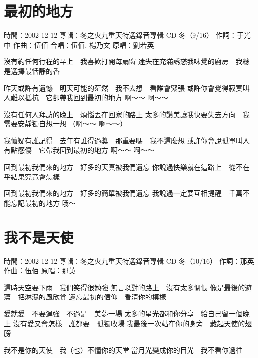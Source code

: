 \documentclass[UTF8,a4paper,oneside,twocolumn,12pt]{ctexbook}
\newcommand{\infopair}[2]{\textbullet #1：#2}
\newcommand{\zc}[1][伍佰]{\infopair{作詞}{#1}}
\newcommand{\zq}[1][伍佰]{\infopair{作曲}{#1}}
\newcommand{\zj}[1]{\infopair{專輯}{#1}}
\newcommand{\yc}[1]{\infopair{原唱}{#1}}
\newcommand{\sj}[1]{\infopair{時間}{#1}}
\newenvironment{info}{\begin{flushleft}\kaishu
	}
	{\end{flushleft}\normalsize\yahei\par}
\newenvironment{lyric}{
	}
{}
\begin{document}
\section{最初的地方}
\begin{info}
	\sj{2002-12-12}
	\zj{冬之火九重天特選錄音專輯 CD 冬（9/16）}
	\zc[于光中]
	\zq
	\infopair{合唱}{伍佰, 楊乃文}
	\yc{劉若英}
\end{info}
\begin{lyric}
	沒有約任何行程的早上　我喜歡打開每扇窗
	迷失在充滿誘惑我味覺的廚房　我總是選擇最恬靜的香

	昨天或許有遺憾　明天可能的茫然　我不去想　看誰會緊張
	或許你會覺得寂寞叫人難以抵抗　它卻帶我回到最初的地方
	啊～～ 啊～～

	沒有任何人拜訪的晚上　煩惱丟在回家的路上
	太多的讚美讓我快要失去方向　我需要安靜獨自想一想
	（啊～～ 啊～～）

	我懷疑有誰記得　去年有誰得過獎　那重要嗎　我不這麼想
	或許你會說孤單叫人有點感傷　它帶我回到最初的地方
	啊～～ 啊～～

	回到最初我們來的地方　好多的天真被我們遺忘
	你說過快樂就在這路上　從不在乎結果究竟會怎樣

	回到最初我們來的地方　好多的簡單被我們遺忘
	我說過一定要互相提醒　千萬不能忘記最初的地方
	哦～
\end{lyric}

\section{我不是天使}
\begin{info}
	\sj{2002-12-12}
	\zj{冬之火九重天特選錄音專輯 CD 冬（10/16）}
	\zc[那英]
	\zq
	\yc{那英}
\end{info}
\begin{lyric}
	這時天空要下雨　我們笑得很勉強
	無言以對的路上　沒有太多惆悵
	像是最後的遊蕩　把淋濕的風欣賞
	遺忘最初的信仰　看清你的模樣

	愛就愛　不要逞強　不過是　美夢一場
	太多的星光都和你分享　給自己留一個晚上
	沒有愛又會怎樣　誰都要　孤獨收場
	我最後一次站在你的身旁　藏起天使的翅膀

	我不是你的天使　我（也）不懂你的天堂
	當月光變成你的目光　我不看你過往
\end{lyric}
\end{document}
